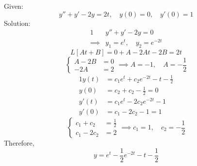 \documentclass[diffeq.tex]{subfiles}
\begin{document}
\np
\begin{homework*}[141.11]
    Given:
    \begin{equation}
        y'' + y' - 2y = 2t,\quad y(0) = 0,\quad y'(0) = 1
    \end{equation}
    Solution:
    \begin{alignat}{1}
        &y'' + y' - 2y = 0\\
        \implies&y_{1} = e^{t},\quad y_{2} = e^{-2t}
    \end{alignat}
    \begin{equation}
        L[At + B] = 0 + A - 2At - 2B = 2t
    \end{equation}
    \begin{equation}
        \begin{cases}
            A - 2B &= 0\\
            -2A &= 2
        \end{cases}
        \implies A = -1,\quad A = -\frac{1}{2}
    \end{equation}
    \begin{alignat}{1}
        y(t) &= c_{1}e^{t} + c_{2}e^{-2t} - t - \frac{1}{2}\\
        y(0) &= c_{2} + c_{2} - \frac{1}{2} = 0\\
        y'(t) &= c_{1}e^{t} - 2c_{2}e^{-2t} - 1\\
        y'(0) &= c_{1} - 2c_{2} - 1 = 1
    \end{alignat}
    \begin{equation}
        \begin{cases}
            c_{1} + c_{2} &= \frac{1}{2}\\
            c_{1} - 2c_{2} &= 2
        \end{cases}
        \implies c_{1} = 1,\quad c_{2} = -\frac{1}{2}
    \end{equation}
    Therefore,
    \begin{equation}
        y = e^{t} - \frac{1}{2}e^{-2t} - t - \frac{1}{2}
    \end{equation}
\end{homework*}
\np
\end{document}

